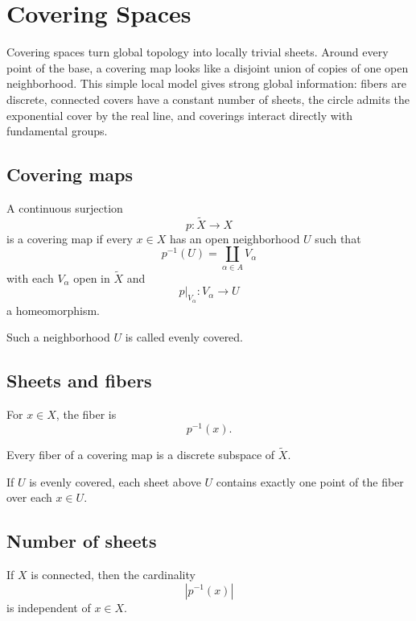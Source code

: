 ﻿\chapter{Covering Spaces}
\label{ch:viii10-covering-spaces}

Covering spaces turn global topology into locally trivial sheets.  Around every
point of the base, a covering map looks like a disjoint union of copies of one
open neighborhood.  This simple local model gives strong global information:
fibers are discrete, connected covers have a constant number of sheets, the
circle admits the exponential cover by the real line, and coverings interact
directly with fundamental groups.

\section{Covering maps}

\begin{definition}
\label{def:viii10-covering-map}
A continuous surjection
\[
p:\widetilde X\to X
\]
is a covering map if every \(x\in X\) has an open neighborhood \(U\) such that
\[
p^{-1}(U)=\coprod_{\alpha\in A}V_\alpha
\]
with each \(V_\alpha\) open in \(\widetilde X\) and
\[
p|_{V_\alpha}:V_\alpha\to U
\]
a homeomorphism.
\end{definition}

Such a neighborhood \(U\) is called evenly covered.

\section{Sheets and fibers}

For \(x\in X\), the fiber is
\[
p^{-1}(x).
\]

\begin{proposition}
\label{prop:viii10-discrete-fibers}
Every fiber of a covering map is a discrete subspace of \(\widetilde X\).
\end{proposition}

If \(U\) is evenly covered, each sheet above \(U\) contains exactly one point
of the fiber over each \(x\in U\).

\section{Number of sheets}

\begin{proposition}
\label{prop:viii10-sheet-number}
If \(X\) is connected, then the cardinality
\[
|p^{-1}(x)|
\]
is independent of \(x\in X\).
\end{proposition}

